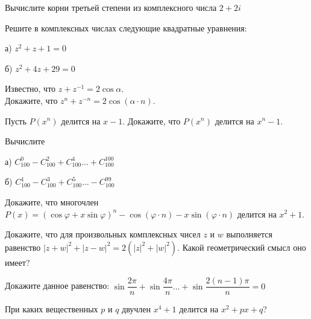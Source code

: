 \documentclass{article}
\begin{document}
\begin{task_boxed}
	Вычислите корни третьей степени из комплексного числа $2+2i$
\end{task_boxed}

\begin{task_boxed}
	Решите в комплексных числах следующие квадратные уравнения:

	а)  $z^2 + z + 1 = 0$

	б)  $z^2 + 4z + 29 = 0$

\end{task_boxed}

\begin{task_boxed}
	Известно, что  $z + z^{-1} = 2\cos{\alpha}$.\\
	Докажите, что  $z^n + z^{-n} = 2\cos{(\alpha \cdot n)}$.
\end{task_boxed}

\begin{task_boxed}
	Пусть $P(x^n)$ делится на  $x - 1$.
	Докажите, что $P(x^n)$ делится на  $x^n - 1$.
\end{task_boxed}

\begin{task_boxed}
	Вычислите

	а) $C_{100}^0 - C_{100}^2 + C_{100}^4 \dots + C_{100}^{100} $

	б) $C_{100}^1 - C_{100}^3 + C_{100}^5 \dots - C_{100}^{99} $
\end{task_boxed}
\begin{task_boxed}
Докажите, что многочлен  $P(x) = (\cos{\varphi} + x\sin{\varphi})^n - \cos{(\varphi\cdot n)} - x\sin{(\varphi\cdot n)}$  делится на  $x^2 + 1$.
\end{task_boxed}

%	
%
%	

\begin{task_boxed}
	Докажите, что для произвольных комплексных чисел $z$ и $w$ выполняется равенство  $|z + w|^2 + | z - w|^2 = 2(|z|^2 + |w|^2)$.
	Какой геометрический смысл оно имеет?
\end{task_boxed}

\begin{task_boxed}
	 Докажите данное равенство: $\sin{\dfrac{2\pi}{n}} + \sin{\dfrac{4\pi}{n}} \dots +\sin{\dfrac{2(n-1)\pi}{n}} = 0$
\end{task_boxed}

\begin{task_boxed}
При каких вещественных $p$ и $q$ двучлен  $x^4 + 1$  делится на  $x^2 + px + q$?%
\end{task_boxed}
\end{document}
